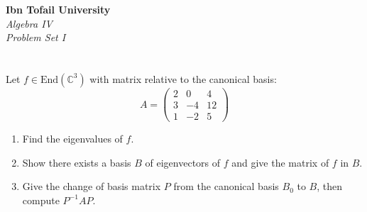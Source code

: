 \documentclass[12pt]{article}
\begin{document}
\begin{center}
\Large\textbf{Ibn Tofail University} \\[1em]
\large\textit{Algebra IV} \\[2em]
\large\textit{Problem Set I} \\[0.5em]
\end{center}

\vspace{1cm}

\section{}
Let \( f \in \text{End}(\mathbb{C}^3) \) with matrix relative to the canonical basis:
\[
A = \begin{pmatrix}
2 & 0 & 4 \\
3 & -4 & 12 \\
1 & -2 & 5
\end{pmatrix}
\]

\begin{enumerate}
    \item Find the eigenvalues of \( f \).
    \item Show there exists a basis \( B \) of eigenvectors of \( f \) and give the matrix of \( f \) in \( B \).
    \item Give the change of basis matrix \( P \) from the canonical basis \( B_0 \) to \( B \), then compute \( P^{-1}AP \).
\end{enumerate}
\end{document}
